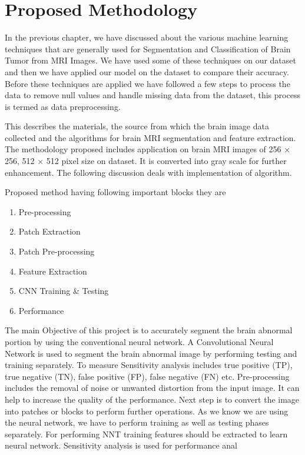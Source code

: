 
\chapter{Proposed Methodology} %

\label{Chapter4} %


In the previous chapter, we have discussed about the various machine learning techniques that are generally used  for Segmentation and Classification of Brain Tumor from MRI Images. We  have  used  some  of  these  techniques  on  our  dataset and  then  we  have  applied  our  model  on  the  dataset  to  compare  their  accuracy.   Before  these techniques are applied we have followed a few steps to process the data to remove null values and handle missing data from the dataset, this process is termed as data preprocessing.

This describes the materials, the source from which the brain image data collected and the algorithms for brain MRI segmentation and feature extraction. The methodology proposed includes application on brain MRI images of 256 × 256, 512 × 512 pixel size on dataset. It is converted into gray scale for further enhancement. The following discussion deals with implementation of algorithm.

Proposed method having following important blocks they are
\begin{enumerate}
    \item Pre-processing
    \item Patch Extraction
    \item Patch Pre-processing
    \item Feature Extraction
    \item CNN Training & Testing
    \item Performance
\end{enumerate}

The main Objective of this project is to accurately segment the brain abnormal portion by using the conventional neural network. A Convolutional Neural Network is used to segment the brain abnormal image by performing testing and training separately. To measure Sensitivity analysis includes true positive (TP), true negative (TN), false positive (FP), false negative (FN) etc. Pre-processing includes the removal of noise or unwanted distortion from the input image. It can help to increase the quality of the performance. Next step is to convert the image into patches or blocks to perform further operations. As we know we are using the neural network, we have to perform training as well as testing phases separately. For performing NNT training features should be extracted to learn neural network. Sensitivity analysis is used for performance anal


